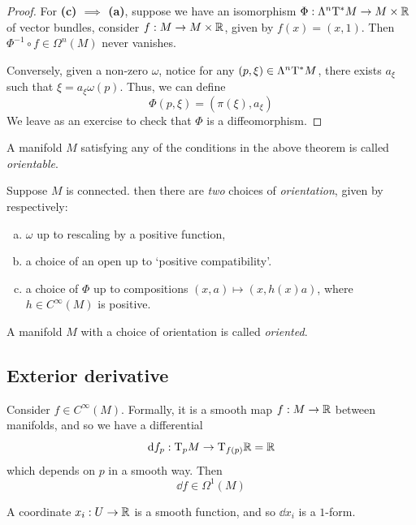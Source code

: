 \documentclass{article}
\begin{document}
\begin{proof}
    For \textbf{(c) \(\implies\) (a)}, suppose we have an isomorphism \(\Phi : \Lambda^n\mathrm{T}^* M \to M \times \mathbb{R}\) of vector bundles, consider \(f : M \to M \times \mathbb{R}\), given by \(f(x) = (x, 1)\). Then \(\Phi^{-1} \circ f \in \Omega^n(M)\) never vanishes.

    Conversely, given a non-zero \(\omega\), notice for any \((p, \xi) \in \Lambda^n \mathrm{T}^* M\), there exists \(a_\xi\) such that \(\xi = a_\xi\omega(p)\). Thus, we can define
    \[\Phi(p, \xi) = (\pi(\xi), a_\xi)\]
    We leave as an exercise to check that \(\Phi\) is a diffeomorphism.
\end{proof}

\begin{definition}
    [orientable] A manifold \(M\) satisfying any of the conditions in the above theorem is called \emph{orientable}.
\end{definition}

Suppose \(M\) is connected. then there are \emph{two} choices of \emph{orientation}, given by respectively:
\begin{enumerate}[(a)]
    \item \(\omega\) up to rescaling by a positive function,
    \item a choice of an open up to `positive compatibility'.
    \item a choice of \(\Phi\) up to compositions \((x, a) \mapsto (x, h(x)a)\), where \(h \in C^\infty(M)\) is positive.
\end{enumerate}

\begin{definition}
    [oriented] A manifold \(M\) with a choice of orientation is called \emph{oriented}.
\end{definition}

\subsection{Exterior derivative}

Consider \(f \in C^\infty(M)\). Formally, it is a smooth map \(f : M \to \mathbb{R}\) between manifolds, and so we have a differential
\[\dd f_p : \mathrm{T}_p M \to \mathrm{T}_{f(p)}\mathbb{R} = \mathbb{R}\]
which depends on \(p\) in a smooth way. Then
\[\dd f \in \Omega^1(M)\]

\begin{remark}
    A coordinate \(x_i : U \to \mathbb{R}\) is a smooth function, and so \(\dd x_i\) is a \(1\)-form.    
\end{remark}
\end{document}
